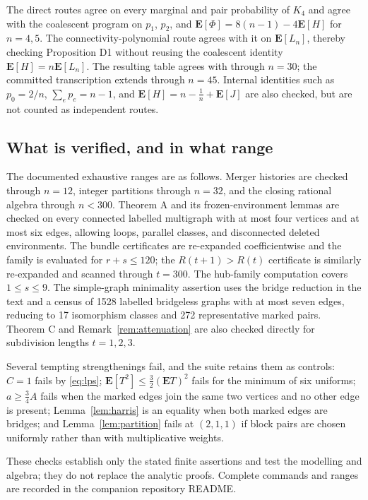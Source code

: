 \documentclass[10pt,a4paper]{amsart}
\newcommand{\E}{\mathbf{E}}
\begin{document}
The direct routes agree on every marginal and pair probability of $K_4$ and
agree with the coalescent program on $p_1$, $p_2$, and
$\E[\Phi]=8(n-1)-4\E[H]$ for $n=4,5$. The connectivity-polynomial route agrees
with it on $\E[L_n]$, thereby checking Proposition D1 without reusing the
coalescent identity $\E[H]=n\E[L_n]$. The resulting table agrees with
\cite{Gamarnik} through $n=30$; the committed transcription extends through
$n=45$. Internal identities such as $p_0=2/n$, $\sum_e p_e=n-1$, and
$\E[H]=n-\frac1n+\E[J]$ are also checked, but are not counted as independent
routes.

\subsection{What is verified, and in what range}

The documented exhaustive ranges are as follows. Merger histories are checked
through $n=12$, integer partitions through $n=32$, and the closing rational
algebra through $n<300$. Theorem A and its frozen-environment lemmas are checked
on every connected labelled multigraph with at most four vertices and at most
six edges, allowing loops, parallel classes, and disconnected deleted
environments. The bundle certificates are re-expanded coefficientwise and the
family is evaluated for $r+s\le120$; the $R(t+1)>R(t)$ certificate is similarly
re-expanded and scanned through $t=300$. The hub-family computation covers
$1\le s\le9$. The simple-graph minimality assertion uses the bridge reduction
in the text and a census of 1528 labelled bridgeless graphs with at most seven
edges, reducing to 17 isomorphism classes and 272 representative marked pairs.
Theorem C and Remark~\ref{rem:attenuation} are also checked directly for
subdivision lengths $t=1,2,3$.

Several tempting strengthenings fail, and the suite retains them as controls:
$C=1$ fails by \eqref{eq:lps}; $\E[T^2]\le\frac32(\E T)^2$ fails for the
minimum of six uniforms; $a\ge\frac34A$ fails when the marked edges join the
same two vertices and no other edge is present; Lemma~\ref{lem:harris} is an
equality when both marked edges are bridges; and Lemma~\ref{lem:partition}
fails at $(2,1,1)$ if block pairs are chosen uniformly rather than with
multiplicative weights.

These checks establish only the stated finite assertions and test the modelling
and algebra; they do not replace the analytic proofs. Complete commands and
ranges are recorded in the companion repository README.
\end{document}
